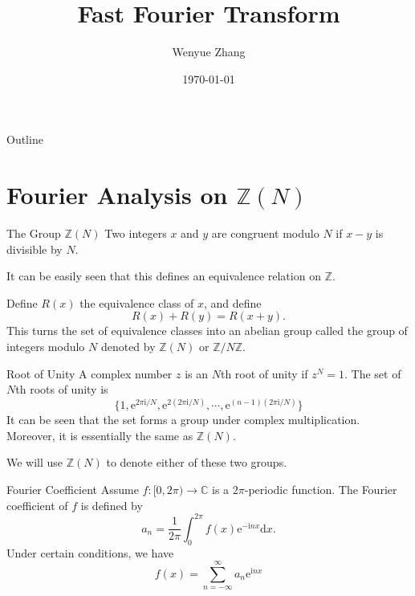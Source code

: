 \documentclass{beamer}
\title{Fast Fourier Transform}
\author{Wenyue Zhang}
\date{\today}
\begin{document}
\begin{frame}
  \titlepage
\end{frame}

\begin{frame}{Outline}
  \tableofcontents
\end{frame}

\section{Fourier Analysis on $\mathbb Z(N)$}

\begin{frame}{The Group $\mathbb Z(N)$}
    Two integers $x$ and $y$ are congruent modulo $N$ if $x - y$ is divisible by $N$.

    \pause

    It can be easily seen that this defines an equivalence relation on $\mathbb Z$.

    \pause

    Define $R(x)$ the equivalence class of $x$, and define $$R(x) + R(y) = R(x + y).$$This turns the set of equivalence classes into an abelian group called the 
    group of integers modulo $N$ denoted by $\mathbb Z(N)$ or $\mathbb Z / N \mathbb Z$.
\end{frame}

\begin{frame}{Root of Unity}
    A complex number $z$ is an $N$th root of unity if $z^N = 1$. The set of $N$th roots of unity is
    $$
    \{1, \text{e}^{2 \pi \text{i}/N}, \text{e}^{2(2 \pi \text{i}/N)}, \cdots, \text{e}^{(n - 1)(2 \pi \text{i}/N)}\}
    $$
    It can be seen that the set forms a group under complex multiplication. Moreover, it is essentially the same as $\mathbb Z(N)$.

    \pause

    We will use $\mathbb Z(N)$ to denote either of these two groups.
\end{frame}

\begin{frame}{Fourier Coefficient}
    Assume $f : [0, 2 \pi) \to \mathbb C$ is a $2 \pi$-periodic function. The Fourier coefficient of $f$ is defined by
    $$
    a_n = \frac{1}{2 \pi}\int_0^{2 \pi} f(x) \text{e}^{-\text{i} n x} \text{d}x.
    $$
    \pause
    Under certain conditions, we have
    $$
    f(x) = \sum_{n = - \infty}^{\infty} a_n \text{e}^{\text{i}nx}
    $$
\end{frame}
\end{document}
